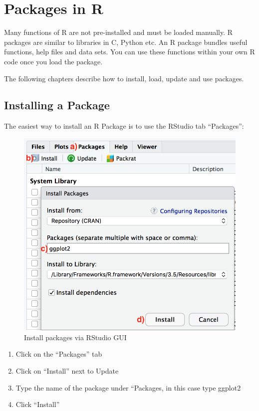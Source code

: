 \documentclass[
]{book}
\begin{document}
\hypertarget{appendix-appendix}{%
\appendix}


\hypertarget{packages}{%
\chapter{Packages in R}\label{packages}}

Many functions of R are not pre-installed and must be loaded manually. R packages are similar to libraries in C, Python etc. An R package bundles useful functions, help files and data sets. You can use these functions within your own R code once you load the package.

The following chapters describe how to install, load, update and use packages.

\hypertarget{installing-a-package}{%
\section{Installing a Package}\label{installing-a-package}}

The easiest way to install an R Package is to use the RStudio tab ``Packages'':

\begin{figure}
\includegraphics[width=0.5\linewidth]{images/a2-installPackagesRStudio} \caption{Install packages via RStudio GUI}\label{fig:knitr-logo}
\end{figure}

\begin{enumerate}
\def\labelenumi{\alph{enumi})}
\item
  Click on the ``Packages'' tab
\item
  Click on ``Install'' next to Update
\item
  Type the name of the package under ``Packages, in this case type ggplot2
\item
  Click ``Install''
\end{enumerate}
\end{document}
